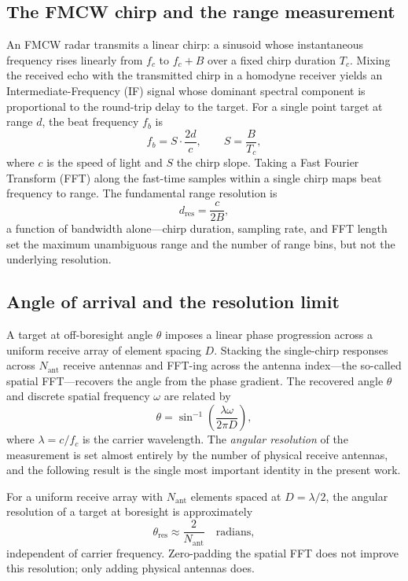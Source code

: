 \documentclass[letterpaper,11pt,leqno]{article}
\begin{document}
\subsection{The FMCW chirp and the range measurement}

An FMCW radar transmits a linear chirp: a sinusoid whose instantaneous frequency rises linearly from $f_c$ to $f_c + B$ over a fixed chirp duration $T_c$. Mixing the received echo with the transmitted chirp in a homodyne receiver yields an Intermediate-Frequency (IF) signal whose dominant spectral component is proportional to the round-trip delay to the target. For a single point target at range $d$, the beat frequency $f_b$ is
\begin{equation}\label{e:beat}
f_b = S\cdot \frac{2d}{c}, \qquad S = \frac{B}{T_c},
\end{equation}
where $c$ is the speed of light and $S$ the chirp slope. Taking a Fast Fourier Transform (FFT) along the fast-time samples within a single chirp maps beat frequency to range. The fundamental range resolution is
\begin{equation}\label{e:rangeres}
d_{\mathrm{res}} = \frac{c}{2B},
\end{equation}
a function of bandwidth alone---chirp duration, sampling rate, and FFT length set the maximum unambiguous range and the number of range bins, but not the underlying resolution.

\subsection{Angle of arrival and the resolution limit}

A target at off-boresight angle $\theta$ imposes a linear phase progression across a uniform receive array of element spacing $D$. Stacking the single-chirp responses across $N_{\mathrm{ant}}$ receive antennas and FFT-ing across the antenna index---the so-called spatial FFT---recovers the angle from the phase gradient. The recovered angle $\theta$ and discrete spatial frequency $\omega$ are related by
\begin{equation}\label{e:angle}
\theta = \sin^{-1}\!\left(\frac{\lambda\omega}{2\pi D}\right),
\end{equation}
where $\lambda=c/f_c$ is the carrier wavelength. The \emph{angular resolution} of the measurement is set almost entirely by the number of physical receive antennas, and the following result is the single most important identity in the present work.

\begin{proposition}\label{p:angres}
For a uniform receive array with $N_{\mathrm{ant}}$ elements spaced at $D=\lambda/2$, the angular resolution of a target at boresight is approximately
\begin{equation}\label{e:angres}
\theta_{\mathrm{res}} \approx \frac{2}{N_{\mathrm{ant}}} \quad \mathrm{radians},
\end{equation}
independent of carrier frequency. Zero-padding the spatial FFT does not improve this resolution; only adding physical antennas does.
\end{proposition}
\end{document}

